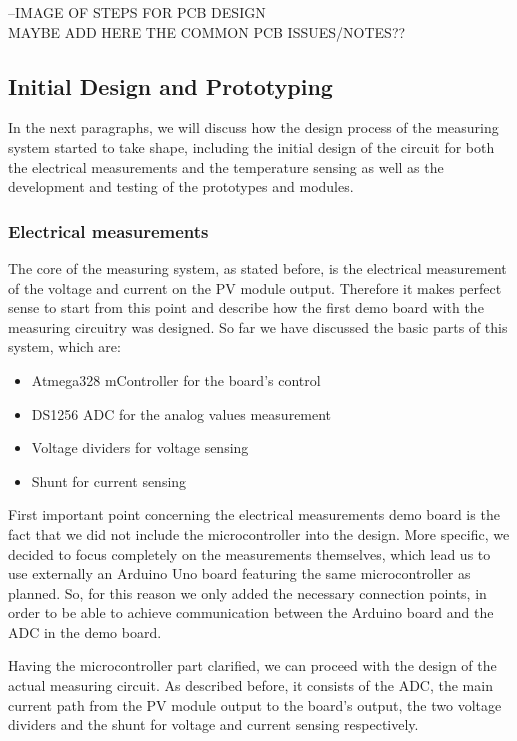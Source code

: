 --IMAGE OF STEPS FOR PCB DESIGN\\

MAYBE ADD HERE THE COMMON PCB ISSUES/NOTES??\\

\subsection{Initial Design and Prototyping}
In the next paragraphs, we will discuss how the design process of the measuring system started to take shape, including the initial design of the circuit for both the electrical measurements and the temperature sensing as well as the development and testing of the prototypes and modules. 

\subsubsection{Electrical measurements}
The core of the measuring system, as stated before, is the electrical measurement of the voltage and current on the PV module output. Therefore it makes perfect sense to start from this point and describe how the first demo board with the measuring circuitry was designed. So far we have discussed the basic parts of this system, which are:

\begin{itemize}
    \item Atmega328 mController for the board's control
    \item DS1256 ADC for the analog values measurement
    \item Voltage dividers for voltage sensing
    \item Shunt for current sensing
\end{itemize}

First important point concerning the electrical measurements demo board is the fact that we did not include the microcontroller into the design. More specific, we decided to focus completely on the measurements themselves, which lead us to use externally an Arduino Uno board featuring the same microcontroller as planned. So, for this reason we only added the necessary connection points, in order to be able to achieve communication between the Arduino board and the ADC in the demo board.

Having the microcontroller part clarified, we can proceed with the design of the actual measuring circuit. As described before, it consists of the ADC, the main current path from the PV module output to the board's output, the two voltage dividers and the shunt for voltage and current sensing respectively.

